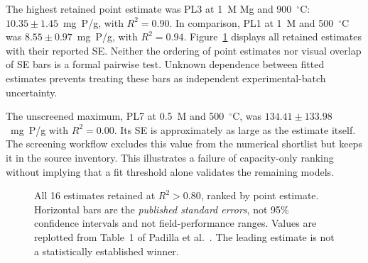 \documentclass[11pt,letterpaper]{article}
\begin{document}
The highest retained point estimate was PL3 at 1~M Mg and 900~$^\circ$C: $10.35\pm1.45$~mg~P/g, with $R^2=0.90$. In comparison, PL1 at 1~M and 500~$^\circ$C was $8.55\pm0.97$~mg~P/g, with $R^2=0.94$. Figure~\ref{fig:capacity} displays all retained estimates with their reported SE. Neither the ordering of point estimates nor visual overlap of SE bars is a formal pairwise test. Unknown dependence between fitted estimates prevents treating these bars as independent experimental-batch uncertainty.

The unscreened maximum, PL7 at 0.5~M and 500~$^\circ$C, was $134.41\pm133.98$~mg~P/g with $R^2=0.00$. Its SE is approximately as large as the estimate itself. The screening workflow excludes this value from the numerical shortlist but keeps it in the source inventory. This illustrates a failure of capacity-only ranking without implying that a fit threshold alone validates the remaining models.

\begin{figure}[p]
\centering
{}
\caption{All 16 estimates retained at $R^2>0.80$, ranked by point estimate. Horizontal bars are the \emph{published standard errors}, not 95\% confidence intervals and not field-performance ranges. Values are replotted from Table~1 of Padilla et al.~\cite{padilla}. The leading estimate is not a statistically established winner.}
\label{fig:capacity}
\end{figure}
\end{document}
